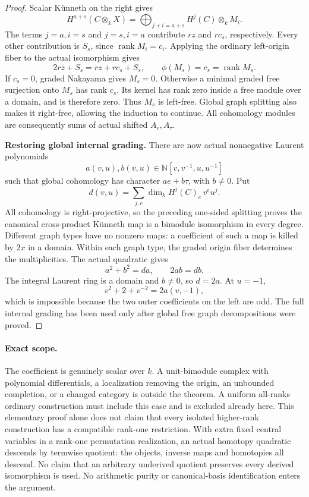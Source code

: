 \documentclass[11pt,a4paper]{article}
\theoremstyle{named}\newtheorem{finding}{Finding}[section]
\theoremstyle{definition}\newtheorem{definition}[finding]{Definition}
\theoremstyle{remark}\newtheorem{remark}[finding]{Remark}
\begin{document}
\begin{proof}
Scalar K\"unneth on the right gives
\[
 H^{a+s}(C\otimes_kX)
       =\bigoplus_{j+i=a+s}H^j(C)\otimes_kM_i.
\]
The terms \(j=a,i=s\) and \(j=s,i=a\) contribute
\(rz\) and \(rc_s\), respectively.
Every other contribution is \(S_s\), since
\(\operatorname{rank}M_i=c_i\).
Applying the ordinary left-origin fiber to the
actual isomorphism gives
\begin{equation}\label{eq:rankOneOriginInduction}
 2rz+S_s=rz+rc_s+S_s,\qquad
 \phi(M_s)=c_s=\operatorname{rank}M_s.
\end{equation}
If \(c_s=0\), graded Nakayama gives \(M_s=0\).
Otherwise a minimal graded free surjection onto
\(M_s\) has rank \(c_s\). Its kernel has rank zero
inside a free module over a domain, and is therefore
zero. Thus \(M_s\) is left-free.
Global graph splitting also makes it right-free,
allowing the induction to continue.
All cohomology modules are consequently sums of
actual shifted \(A_e,A_\tau\).

\par\smallskip\noindent\textbf{Restoring global internal grading.}\quad
There are now actual nonnegative Laurent polynomials
\[
 a(v,u),b(v,u)\in\mathbb N[v,v^{-1},u,u^{-1}]
\]
such that global cohomology has character \(ae+b\tau\),
with \(b\ne0\). Put
\[
 d(v,u)=\sum_{j,e}\dim_kH^j(C)_e\,v^eu^j.
\]
All cohomology is right-projective, so the preceding
one-sided splitting proves the canonical cross-product
K\"unneth map is a bimodule isomorphism in every degree.
Different graph types have no nonzero maps: a coefficient
of such a map is killed by \(2x\) in a domain.
Within each graph type, the graded origin fiber
determines the multiplicities. The actual quadratic gives
\[
 a^2+b^2=da,\qquad 2ab=db.
\]
The integral Laurent ring is a domain and \(b\ne0\),
so \(d=2a\). At \(u=-1\),
\[
                    v^2+2+v^{-2}=2a(v,-1),
\]
which is impossible because the two outer coefficients
on the left are odd.
The full internal grading has been used only after
global free graph decompositions were proved.
\end{proof}

\paragraph{Exact scope.}
The coefficient is genuinely scalar over \(k\).
A unit-bimodule complex with polynomial differentials,
a localization removing the origin, an unbounded
completion, or a changed category is outside the theorem.
A uniform all-ranks ordinary construction must include
this case and is excluded already here.
This elementary proof alone does not claim that every
isolated higher-rank construction has a compatible
rank-one restriction.
With extra fixed central variables in a rank-one
permutation realization, an actual homotopy quadratic
descends by termwise quotient: the objects, inverse
maps and homotopies all descend. No claim that an
arbitrary underived quotient preserves every derived
isomorphism is used. No arithmetic purity or
canonical-basis identification enters the argument.
\end{document}
